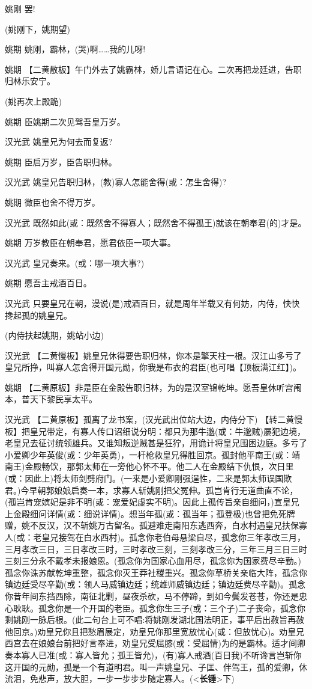 姚刚 罢!

(姚刚下，姚期望)

姚期 姚刚，霸林，(哭)啊\ldots{}\ldots{}我的儿呀!

姚期
【二黄散板】午门外去了姚霸林，娇儿言语记在心。二次再把龙廷进，告职归林乐安宁。

(姚再次上殿跪)

姚期 臣姚期二次见驾吾皇万岁。

汉光武 姚皇兄为何去而复返?

姚期 臣启万岁，臣告职归林。

汉光武 姚皇兄告职归林，(教)寡人怎能舍得(或：怎生舍得)?

姚期 微臣也舍不得万岁。

汉光武
既然如此(或：既然舍不得寡人；既然舍不得孤王)就该在朝奉君(的)才是。

姚期 万岁教臣在朝奉君，愿君依臣一项大事。

汉光武 皇兄奏来。(或：哪一项大事?)

姚期 愿吾主戒酒百日。

汉光武
只要皇兄在朝，漫说(是)戒酒百日，就是周年半载又有何妨，内侍，快快搀起孤的姚皇兄。

(内侍扶起姚期，姚站小边)

汉光武
【二黄慢板】姚皇兄休得要告职归林，你本是擎天柱一根。汉江山多亏了皇兄所挣，叫寡人怎舍得开国元勋，你我是布衣的君臣(也可唱【顶板满江红】)。

姚期
【二黄原板】非是臣在金殿告职归林，为的是汉室锦乾坤。愿吾皇休听宫闱本，普天下黎民享太平。

汉光武 【二黄原板】孤离了龙书案，(汉光武出位站大边，内侍分下)
【转二黄慢板】把皇兄带定，有寡人传口诏细说分明：都只为那牛邈(或：牛邈贼)屡犯边境，老皇兄去征讨统领雄兵。又谁知叛逆贼甚是狂狞，用诡计将皇兄围困边庭。多亏了小爱卿少年英俊(或：少年英勇)，一杆枪救皇兄得胜回京。孤封他平南王(或：靖南王)金殿畅饮，那郭太师在一旁他心怀不平。他二人在金殿结下仇恨，次日里(或：因此上)将太师剑劈府门。(一来是小爱卿刚强逞性，二来是郭太师误国欺君。)今早朝郭娘娘启奏一本，求寡人斩姚刚把父冤伸。孤岂肯行无道曲直不论，(孤岂肯宠嫔妃是非不明(或：宠爱妃虚实不明)。因此上孤传旨亲自细问，)宣皇兄上金殿细问详情(或：细说详情)。想当年孤(或：孤当年；孤登极)也曾把免死牌赠，姚不反汉，汉不斩姚万古留名。孤避难走南阳东逃西奔，白水村遇皇兄扶保寡人(或：老皇兄接驾在白水西村)。孤念你老伯母悬梁自尽，孤念你三年孝改三月，三月孝改三日，三日孝改三时，三时孝改三刻，三刻孝改三分，三年三月三日三时三刻三分永不戴孝未报娘恩。(孤念你为国家心血用尽，孤念你为国家费尽辛勤。)孤念你诛苏献乾坤重整，孤念你灭王莽社稷重兴。孤念你草桥关亲临大阵，孤念你镇边廷受尽辛勤(或：领人马威镇边廷；统雄师威镇边廷；镇边廷费尽辛勤)。孤念你昔年间东挡西除，南征北剿，昼夜杀砍，马不停蹄，到如今鬓发苍苍，你还是忠心耿耿。孤念你是一个开国的老臣。孤念你生三子(或：三个子)二子丧命，孤念你剩姚刚一脉后根。(此二句台上可不唱:将姚刚发湖北国法明正，事平后出赦旨再赦他回京。)劝皇兄你且把愁眉展定，劝皇兄你那里宽放忧心(或：但放忧心)。劝皇兄西宫去在娘娘台前把好言奉进，劝皇兄受屈膝(或：受屈情)为的是霸林。适才间卿奏本寡人已准(或：寡人皆允；孤王皆允)，(有)寡人戒酒(百日我)不听谗言岂斩你这开国的元勋，孤是一个有道明君。叫一声姚皇兄、子匡、伴驾王，孤的爱卿，休流泪，免悲声，放大胆，一步一步步步随定寡人。(\textless{}\textbf{长锤}\textgreater{}下)

